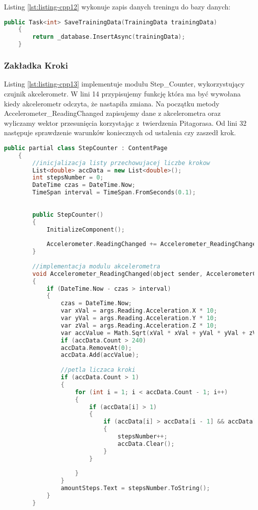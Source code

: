 Listing \ref{lst:listing-cpp12} wykonuje zapis danych treningu do bazy danych:
\begin{lstlisting}[caption=Zapis danych do bazy danych, label={lst:listing-cpp12}, language=C++]
	public Task<int> SaveTrainingData(TrainingData trainingData)      
	{
		return _database.InsertAsync(trainingData);
	}
\end{lstlisting}

\subsubsection{Zakładka Kroki} %

\hspace{0.60cm}Listing \ref{lst:listing-cpp13} implementuje modułu Step\_Counter, wykorzystujący czujnik akcelerometr. W lini 14 przypisujemy funkcję która ma być wywołana kiedy akcelerometr odczyta, że nastapiła zmiana. Na początku metody Accelerometer\_ReadingChanged zapisujemy dane z akcelerometra oraz wyliczamy wektor przesunięcia korzystając z~twierdzenia Pitagorasa. Od lini 32 następuje sprawdzenie warunków koniecznych od ustalenia czy zaszedł krok.
\begin{lstlisting}[caption=Krakomierz i akcelerometr, label={lst:listing-cpp13}, language=C++]
	public partial class StepCounter : ContentPage
	{
		//inicjalizacja listy przechowujacej liczbe krokow
		List<double> accData = new List<double>();
		int stepsNumber = 0;
		DateTime czas = DateTime.Now;
		TimeSpan interval = TimeSpan.FromSeconds(0.1);
		
		
		public StepCounter()
		{
			InitializeComponent();
			
			Accelerometer.ReadingChanged += Accelerometer_ReadingChanged;
		}
		
		//implementacja modulu akcelerometra
		void Accelerometer_ReadingChanged(object sender, AccelerometerChangedEventArgs args)
		{
			if (DateTime.Now - czas > interval)
			{
				czas = DateTime.Now;
				var xVal = args.Reading.Acceleration.X * 10;
				var yVal = args.Reading.Acceleration.Y * 10;
				var zVal = args.Reading.Acceleration.Z * 10;
				var accValue = Math.Sqrt(xVal * xVal + yVal * yVal + zVal * zVal) - 10;
				if (accData.Count > 240)
				accData.RemoveAt(0);
				accData.Add(accValue);
				
				//petla liczaca kroki
				if (accData.Count > 1)
				{
					for (int i = 1; i < accData.Count - 1; i++)
					{
						if (accData[i] > 1)
						{
							if (accData[i] > accData[i - 1] && accData[i] > accData[i + 1])
							{
								stepsNumber++;
								accData.Clear();
							}
						}
						
					}
				}
				amountSteps.Text = stepsNumber.ToString();
			}
		}
\end{lstlisting}

